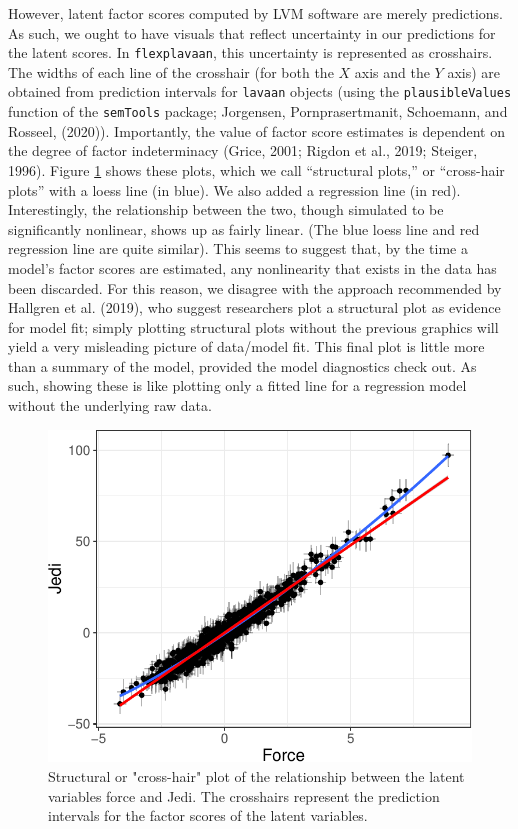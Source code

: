 \documentclass[
  english,
  man]{apa6}
\begin{document}
However, latent factor scores computed by LVM software are merely predictions. As such, we ought to have visuals that reflect uncertainty in our predictions for the latent scores. In \texttt{flexplavaan}, this uncertainty is represented as crosshairs. The widths of each line of the crosshair (for both the \(X\) axis and the \(Y\) axis) are obtained from prediction intervals for \texttt{lavaan} objects (using the \texttt{plausibleValues} function of the \texttt{semTools} package; Jorgensen, Pornprasertmanit, Schoemann, and Rosseel, (2020)). Importantly, the value of factor score estimates is dependent on the degree of factor indeterminacy (Grice, 2001; Rigdon et al., 2019; Steiger, 1996). Figure \ref{fig:beech} shows these plots, which we call ``structural plots,'' or ``cross-hair plots'' with a loess line (in blue). We also added a regression line (in red). Interestingly, the relationship between the two, though simulated to be significantly nonlinear, shows up as fairly linear. (The blue loess line and red regression line are quite similar). This seems to suggest that, by the time a model's factor scores are estimated, any nonlinearity that exists in the data has been discarded. For this reason, we disagree with the approach recommended by Hallgren et al. (2019), who suggest researchers plot a structural plot as evidence for model fit; simply plotting structural plots without the previous graphics will yield a very misleading picture of data/model fit. This final plot is little more than a summary of the model, provided the model diagnostics check out. As such, showing these is like plotting only a fitted line for a regression model without the underlying raw data.

\begin{figure}

{\centering \includegraphics[width=0.5\linewidth]{flexplavaan_draft_files/figure-latex/beech-1} 

}

\caption{Structural or "cross-hair" plot of the relationship between the latent variables force and Jedi. The crosshairs represent the prediction intervals for the factor scores of the latent variables.}\label{fig:beech}
\end{figure}
\end{document}
